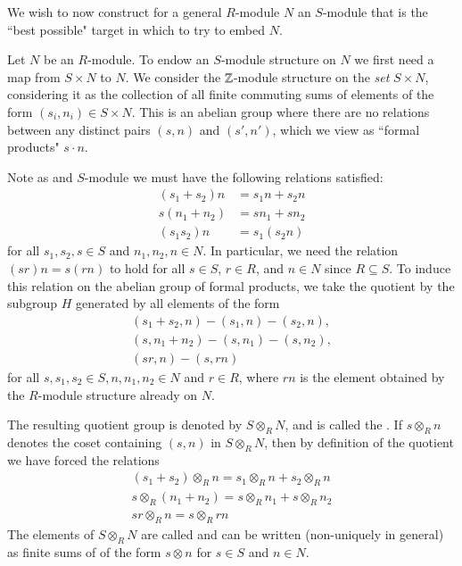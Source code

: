 \documentclass[12pt, a4paper, twoside, openright, titlepage]{book}
\begin{document}
We wish to now construct for a general $R$-module $N$ an $S$-module that is the ``best possible" target in which to try to embed $N$.

\begin{cons}{}{}
    Let $N$ be an $R$-module. To endow an $S$-module structure on $N$ we first need a map from $S\times N$ to $N$. We consider the $\mathbb Z$-module structure on the \emph{set} $S\times N$, considering it as the collection of all finite commuting sums of elements of the form $(s_i,n_i) \in S\times N$. This is an abelian group where there are no relations between any distinct pairs $(s,n)$ and $(s',n')$, which we view as ``formal products" $s\cdot n$. 

    Note as and $S$-module we must have the following relations satisfied: \begin{align*}
        (s_1+s_2)n &= s_1n+s_2n \\
        s(n_1+n_2) &= sn_1+sn_2 \\
        (s_1s_2)n &= s_1(s_2n)
    \end{align*}
    for all $s_1,s_2,s \in S$ and $n_1,n_2,n \in N$. In particular, we need the relation $(sr)n = s(rn)$ to hold for all $s \in S$, $r \in R$, and $n \in N$ since $R \subseteq S$. To induce this relation on the abelian group of formal products, we take the quotient by the subgroup $H$ generated by all elements of the form \begin{equation*}
        \begin{array}{c}
            (s_1+s_2,n) - (s_1,n) - (s_2,n), \\
            (s,n_1+n_2) - (s,n_1) - (s,n_2), \\
            (sr,n) - (s,rn) 
        \end{array}
    \end{equation*}
    for all $s,s_1,s_2 \in S, n, n_1,n_2 \in N$ and $r \in R$, where $rn$ is the element obtained by the $R$-module structure already on $N$.


    The resulting quotient group is denoted by $S\otimes_R N$, and is called the . If $s\otimes_R n$ denotes the coset containing $(s,n)$ in $S\otimes_R N$, then by definition of the quotient we have forced the relations \begin{equation*}
        \begin{array}{c}
            (s_1+s_2)\otimes_Rn = s_1\otimes_R n + s_2\otimes_R n \\
            s\otimes_R(n_1+n_2) = s\otimes_R n_1+s\otimes_Rn_2 \\
            sr\otimes_R n = s\otimes_Rrn
        \end{array}
    \end{equation*}
    The elements of $S\otimes_RN$ are called  and can be written (non-uniquely in general) as finite sums of  of the form $s\otimes n$ for $s \in S$ and $n \in N$.


\end{cons}
\end{document}
